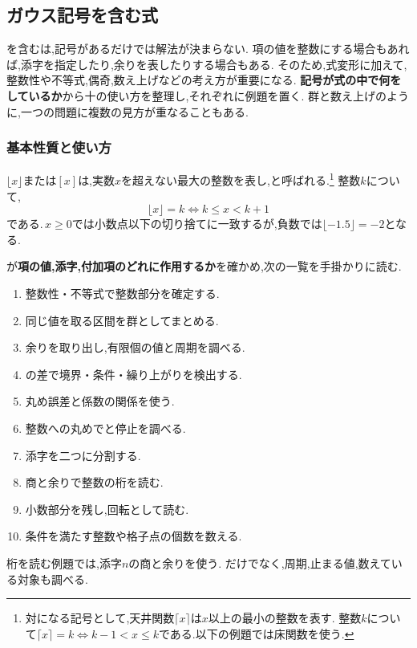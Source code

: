 \subsection{ガウス記号を含む式}\label{節：ガウス型}
  を含むは,記号があるだけでは解法が決まらない.
  項の値を整数にする場合もあれば,添字を指定したり,余りを表したりする場合もある.
  そのため,式変形に加えて,整数性や不等式,偶奇,数え上げなどの考え方が重要になる.
  \textbf{記号が式の中で何をしているか}から十の使い方を整理し,それぞれに例題を置く.
  群と数え上げのように,一つの問題に複数の見方が重なることもある.

  \subsubsection{基本性質と使い方}\label{節：ガウス型の下準備}
    $\lfloor x\rfloor$または$[x]$は,実数$x$を超えない最大の整数を表し,と呼ばれる.\footnote{対になる記号として,天井関数$\lceil x\rceil$は$x$以上の最小の整数を表す.
    整数$k$について$\lceil x\rceil=k\iff k-1<x\le k$である.以下の例題では床関数を使う.}
    整数$k$について,
    \[
      \lfloor x\rfloor=k\iff k\le x<k+1
    \]
    である.\,$x\ge0$では小数点以下の切り捨てに一致するが,負数では$\lfloor-1.5\rfloor=-2$となる.

    \BookFigFloorGraph

    が\textbf{項の値,添字,付加項のどれに作用するか}を確かめ,次の一覧を手掛かりに読む.
    \begin{enumerate}[label=(\arabic*)]
      \item 整数性・不等式で整数部分を確定する.
      \item 同じ値を取る区間を群としてまとめる.
      \item 余りを取り出し,有限個の値と周期を調べる.
      \item {}の差で境界・条件・繰り上がりを検出する.
      \item 丸め誤差と係数の関係を使う.
      \item 整数への丸めでと停止を調べる.
      \item 添字を二つに分割する.
      \item 商と余りで整数の桁を読む.
      \item 小数部分を残し,回転として読む.
      \item 条件を満たす整数や格子点の個数を数える.
    \end{enumerate}
    桁を読む例題では,添字$n$の商と余りを使う.
    だけでなく,周期,止まる値,数えている対象も調べる.

